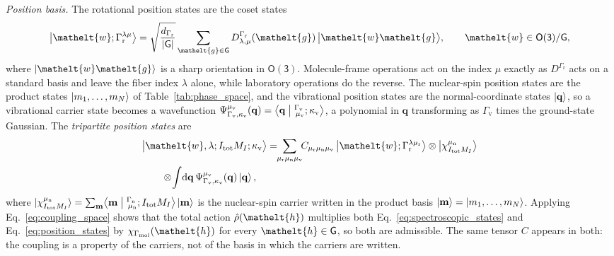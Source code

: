 \documentclass[
  reprint,
  aps,
  prx,
  superscriptaddress,
  amsmath,
  amssymb,
  longbibliography
]{revtex4-2}
\newcommand{\eltfont}[1]{{\let\sigma\eltsigma\mathelt{#1}}}
\newcommand{\grp}[1]{\mathsf{#1}}
\newcommand{\elt}[1]{\eltfont{#1}}
\newcommand{\diff}{\mathrm{d}}
\newcommand{\repD}[1]{D^{#1}}
\newcommand{\irchar}[1]{\chi_{#1}}
\newcommand{\mult}{\kappa}
\newcommand{\gel}{\elt{g}}             %
\newcommand{\hel}{\elt{h}}             %
\newcommand{\crep}{\elt{w}}           %
\providecommand{\Gmol}{\Gamma_{\mathrm{mol}}}
\providecommand{\Grot}{\Gamma_{\mathrm{r}}}
\providecommand{\Gvib}{\Gamma_{\mathrm{v}}}
\providecommand{\Gspin}{\Gamma_{\mathrm{n}}}
\begin{document}
\emph{Position basis.} The rotational position states are the coset states
\begin{equation}
  \bigl|\crep;\Grot^{\lambda\mu}\bigr\rangle
  =\sqrt{\frac{d_{\Grot}}{|\grp{G}|}}\sum_{\gel\in \grp{G}}
  \repD{\Grot}_{\lambda,\mu}(\gel)\,
  \bigl|\crep\gel\bigr\rangle,
  \qquad \crep\in \grp{O(3)}/\grp{G},
  \label{eq:coset_states}
\end{equation}
where $\ket{\crep\gel}$ is a sharp orientation in $\grp{O(3)}$. Molecule-frame operations act on the index $\mu$ exactly as $\repD{\Grot}$ acts on a standard basis and leave the fiber index $\lambda$ alone, while laboratory operations do the reverse. The nuclear-spin position states are the product states $\ket{m_1,\ldots,m_N}$ of Table~\ref{tab:phase_space}, and the vibrational position states are the normal-coordinate states $\ket{\mathbf q}$, so a vibrational carrier state becomes a wavefunction $\Psi^{\mu_{\mathrm v}}_{\Gvib,\mult_{\mathrm v}}(\mathbf q)=\bigl\langle\mathbf q\bigm\vert{}^{\Gvib}_{\,\mu_{\mathrm v}};\mult_{\mathrm v}\bigr\rangle$, a polynomial in $\mathbf q$ transforming as $\Gvib$ times the ground-state Gaussian. The \emph{tripartite position states} are
\begin{align}
  &\bigl|\crep,\lambda;I_{\mathrm{tot}}M_I;\mult_{\mathrm v}\bigr\rangle
  =\!\!\sum_{\mu_{\mathrm r}\mu_{\mathrm n}\mu_{\mathrm v}}\!\!
  C_{\mu_{\mathrm r}\mu_{\mathrm n}\mu_{\mathrm v}}\,
  \bigl|\crep;\Grot^{\lambda\mu_{\mathrm r}}\bigr\rangle
  \otimes\bigl|\chi^{\mu_{\mathrm n}}_{I_{\mathrm{tot}}M_I}\bigr\rangle
  \nonumber\\
  &\qquad\otimes\!\int\!\diff\mathbf q\,\Psi^{\mu_{\mathrm v}}_{\Gvib,\mult_{\mathrm v}}(\mathbf q)\ket{\mathbf q},
  \label{eq:position_states}
\end{align}
where $\ket{\chi^{\mu_{\mathrm n}}_{I_{\mathrm{tot}}M_I}}=\sum_{\mathbf m}\bigl\langle\mathbf m\bigm\vert{}^{\Gspin}_{\,\mu_{\mathrm n}};I_{\mathrm{tot}}M_I\bigr\rangle\ket{\mathbf m}$ is the nuclear-spin carrier written in the product basis $\ket{\mathbf m}=\ket{m_1,\ldots,m_N}$.
Applying Eq.~\eqref{eq:coupling_space} shows that the total action $\hat\rho(\hel)$ multiplies both Eq.~\eqref{eq:spectroscopic_states} and Eq.~\eqref{eq:position_states} by $\irchar{\Gmol}(\hel)$ for every $\hel\in\grp{G}$, so both are admissible. The same tensor $C$ appears in both: the coupling is a property of the carriers, not of the basis in which the carriers are written.
\end{document}
